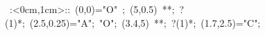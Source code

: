 
\hbox{
\xy    <1cm,0cm>:<0cm,1cm>::
       (0,0)="O" ; (5,0.5) **\dir{-};  ?(1)*\dir{>}; (2.5,0.25)="A"; %
       "O"; (3.4,5) **\dir{-};  ?(1)*\dir{>}; (1.7,2.5)="C"; %
       \endxy}
	   
